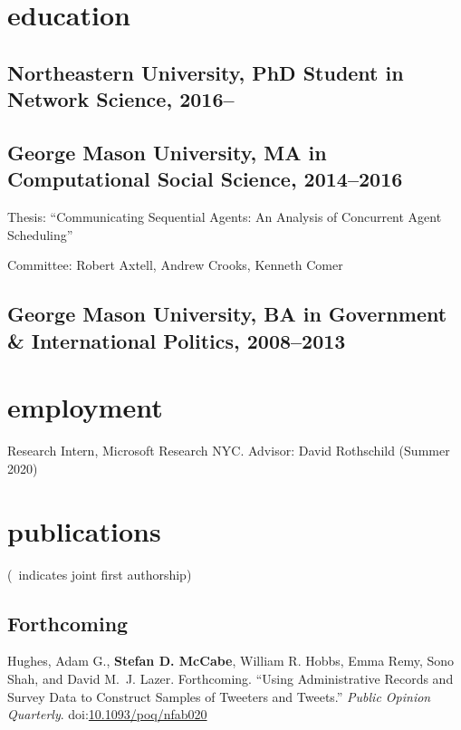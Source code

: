 \documentclass[11pt, letter]{article}
\title{}
\begin{document}
\maketitle

\section{education}
\subsection{Northeastern University, PhD Student in Network Science, 2016--}
\subsection{George Mason University, MA in Computational Social Science,
  2014--2016}
Thesis: ``Communicating Sequential Agents: An Analysis of Concurrent Agent
Scheduling''

Committee: Robert Axtell, Andrew Crooks, Kenneth Comer
\subsection{George Mason University, BA in Government \& International Politics,
  2008--2013}

\vspace{2mm}

\section{employment}
Research Intern, Microsoft Research NYC. Advisor: David Rothschild (Summer 2020)
\vspace{-1mm}
\section{publications}
\vspace{1mm} {\footnotesize (\textdagger\, indicates joint first authorship)}
\subsection*{} %

\subsection{Forthcoming}
\begin{hangparas}{.25in}{1}
Hughes, Adam G.,\textsuperscript{\textdagger} \textbf{Stefan D.
McCabe},\textsuperscript{\textdagger} William R. Hobbs, Emma Remy, Sono
Shah, and David M.~J. Lazer. Forthcoming. ``Using Administrative Records and
Survey Data to Construct Samples of Tweeters and Tweets.'' \textit{Public
Opinion Quarterly}.
doi:\href{https://doi.org/10.1093/poq/nfab020}{10.1093/poq/nfab020}
\vspace{2mm}
\end{hangparas}
\end{document}
